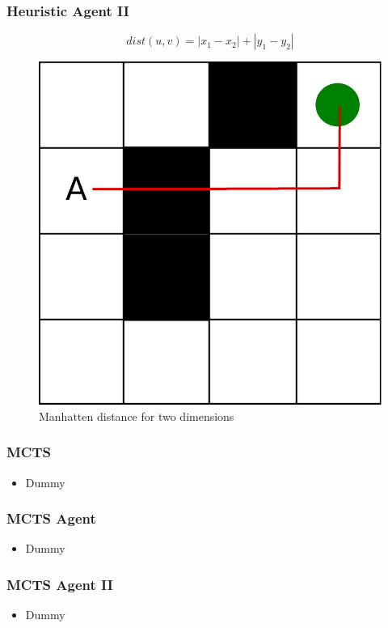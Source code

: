\documentclass{beamer}
\begin{document}
\begin{frame}
\frametitle{Heuristic Agent II}
\begin{equation}
dist(u,v) = |x_{1} - x_{2}| + |y_{1} - y_{2}|
\end{equation}
\begin{figure}
\centering
\includegraphics[scale=0.3]{../report/images/manhatten.pdf}
\caption{Manhatten distance for two dimensions}
\label{fig:manhatten}
\end{figure}
\end{frame}





\begin{frame}
\frametitle{MCTS}
\begin{itemize}
 \item Dummy
\end{itemize}
\end{frame}

\begin{frame}
\frametitle{MCTS Agent}
\begin{itemize}
 \item Dummy
\end{itemize}
\end{frame}

\begin{frame}
\frametitle{MCTS Agent II}
\begin{itemize}
 \item Dummy
\end{itemize}
\end{frame}
\end{document}

